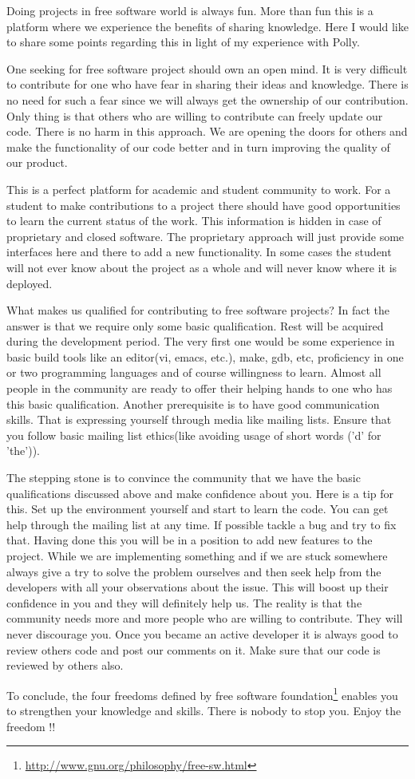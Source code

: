 Doing projects in free software world is always fun. More than fun this is a platform where
we experience the benefits of sharing knowledge. Here I would like to share some points 
regarding this in light of my experience with Polly.

One seeking for free software project should own an open mind. It is very difficult to
contribute for one who have fear in sharing their ideas and knowledge. There is no need for
such a fear since we will always get the ownership of our contribution. Only thing is that
others who are willing to contribute can freely update our code. There is no harm in
this approach. We are opening the doors for others and make the functionality
of our code better and in turn improving the quality of our product.

This is a perfect platform for academic and student community to work. For a student to
make contributions to a project there should have good opportunities to learn the
current status of the work. This information is hidden in case of proprietary and closed software.
The proprietary approach will just provide some interfaces here and there to add a
new functionality. In some cases the student will not ever know about the project as a whole and
will never know where it is deployed.

What makes us qualified for contributing to free software projects? In fact the answer is
that we require only some basic qualification. Rest will be acquired during the development period.
The very first one would be some experience in basic build tools like an editor(vi, emacs, etc.),
make, gdb, etc, proficiency in one or two programming languages and of course willingness to learn.
Almost all people in the community are ready to offer their helping hands to one who has this
basic qualification. Another prerequisite is to have good communication skills. That is expressing
yourself through media like mailing lists. Ensure that you follow basic mailing list ethics(like avoiding
usage of short words ('d' for 'the')). 

The stepping stone is to convince the community that we have the basic qualifications discussed
above and make confidence about you. Here is a tip for this. Set up the environment yourself
and start to learn the code. You can get help through the
mailing list at any time. If possible tackle a bug and try to fix that. Having done this you will
be in a position to add new features to the project. While we are implementing something and if we
are stuck somewhere always give a try to solve the problem ourselves and then seek help from
the developers with all your observations about the issue. This will boost up their confidence
in you and they will definitely help us. The reality is that the community needs more and more
people who are willing to contribute. They will never discourage you. Once you became an active
developer it is always good to review others code and post our comments on it. Make sure that
our code is reviewed by others also.

To conclude, the four freedoms defined by free software foundation\footnote{\url{http://www.gnu.org/philosophy/free-sw.html}}
enables you to strengthen your knowledge and skills. There is nobody to stop you. Enjoy the freedom !!
